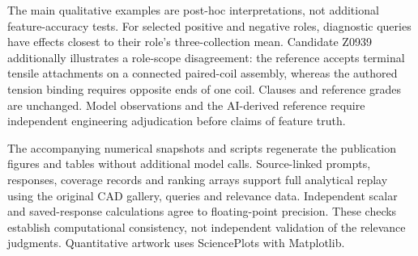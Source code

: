 \documentclass[10pt,a4paper]{article}
\begin{document}
The main qualitative examples are post-hoc interpretations, not additional
feature-accuracy tests. For selected positive and negative roles, diagnostic
queries have effects closest to their role's three-collection mean. Candidate
Z0939 additionally illustrates a role-scope disagreement: the reference accepts
terminal tensile attachments on a connected paired-coil assembly, whereas the
authored tension binding requires opposite ends of one coil. Clauses and
reference grades are unchanged. Model observations and the AI-derived reference
require independent engineering adjudication before claims of feature truth.

The accompanying numerical snapshots and scripts regenerate the publication
figures and tables without additional model calls. Source-linked prompts,
responses, coverage records and ranking arrays support full analytical replay
using the original CAD gallery, queries and relevance data. Independent scalar
and saved-response calculations agree to floating-point precision. These checks
establish computational consistency, not independent validation of the relevance
judgments. Quantitative artwork uses SciencePlots with Matplotlib.
\end{document}
